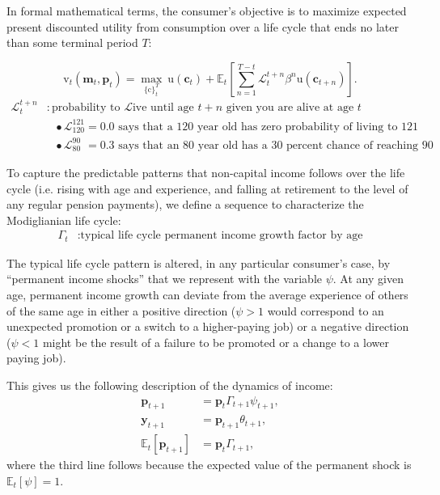 \documentclass{article}
\newcommand{\uFunc}{\mathrm{u}}
\newcommand{\cLvl}{\mathbf{c}}
\newcommand{\mLvl}{\mathbf{m}}
\newcommand{\yLvl}{\mathbf{y}}
\newcommand{\pLvl}{\mathbf{p}}
\newcommand{\DiscFac}{\beta}
\newcommand{\cFunc}{\mathrm{c}}
\newcommand{\vFunc}{\mathrm{v}}
\newcommand{\Alive}{\mathcal{L}}
\newcommand{\Ex}{\mathbb{E}}
\newcommand{\permGroFac}{\Gamma}
\newcommand{\permShk}{\psi}
\newcommand{\tranShk}{\theta}
\begin{document}
In formal mathematical terms, the consumer's objective is to maximize expected present discounted utility from consumption over a life cycle that ends no later than some terminal period $T$:

\begin{equation}
\label{eq:lifecyclemax}
\pmb{\vFunc}_{t}(\mLvl_{t},\pLvl_{t}) = \max_{\{\pmb{\cFunc}\}_{t}^{T}} ~ \uFunc(\cLvl_{t})+\Ex_{t}\left[\sum_{n=1}^{T-t} \Alive_{t}^{t+n}{\DiscFac}^{n} \uFunc(\cLvl_{t+n}) \right].
\end{equation}
\begin{align*}
    \Alive _{t}^{t+n} & : \text{probability to } \Alive \text{ive until age $t+n$ given you are alive at age $t$}
    \\                   & {~~~}\bullet \Alive_{120}^{121} = 0.0 \text{ says that a 120 year old has zero probability of living to 121}
    \\                   & {~~~}\bullet \Alive_{80\phantom{1}}^{90\phantom{1}} = 0.3 \text{ says that an 80 year old has a 30 percent chance of reaching 90}
    \end{align*}

To capture the predictable patterns that non-capital income follows over the life cycle (i.e. rising with age and experience, and falling at retirement to the level of any regular pension payments), we define a sequence to characterize the Modiglianian life cycle:
\begin{align}
    \permGroFac_{t} & : \text{typical life cycle permanent income growth factor by age}
\end{align}

The typical life cycle pattern is altered, in any particular consumer's case, by ``permanent income shocks'' that we represent with the variable $\permShk$.
At any given age, permanent income growth can deviate from the average experience of others of the same age in either a positive direction ($\psi>1$ would correspond to an unexpected promotion or a switch to a higher-paying job) or a negative direction ($\psi < 1$ might be the result of a failure to be promoted or a change to a lower paying job).

This gives us the following description of the dynamics of income:
\begin{align}
    \pLvl_{t+1} & = \pLvl_{t} \permGroFac_{t+1} \permShk_{t+1}, \\
    \yLvl_{t+1} & = \pLvl_{t+1} \tranShk_{t+1}, \\
    \Ex_{t}[\pLvl_{t+1}] & = \pLvl_{t} \permGroFac_{t+1},
\end{align}
where the third line follows because the expected value of the permanent shock is $\Ex_{t}[\permShk]=1$.
\end{document}
